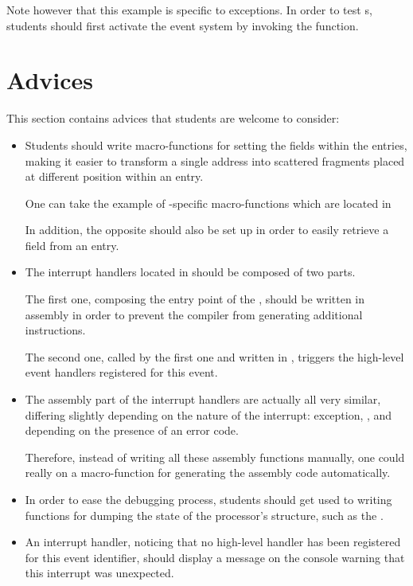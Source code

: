 Note however that this example is specific to exceptions. In order to test
s, students should first activate the event system by invoking the
 function.

%
%

\section{Advices}

This section contains advices that students are welcome to consider:

\begin{itemize}
  \item
    Students should write macro-functions for setting the fields within
    the  entries, making it easier to transform a single address
    into scattered fragments placed at different position within an entry.

    \-

    One can take the example of -specific macro-functions
    which are located in \\

    \-

    In addition, the opposite should also be set up in order to easily
    retrieve a field from an  entry.
  \item
    The interrupt handlers located in  should be
    composed of two parts.

    \-

    The first one, composing the entry point of the , should be written in assembly in order to prevent
    the compiler from generating additional instructions.

    \-

    The second one, called by the first one and written in , triggers
    the high-level event handlers registered for this event.
  \item
    The assembly part of the interrupt handlers are actually all very similar,
    differing slightly depending on the nature of the interrupt: exception,
    ,  \etc{} and depending on the presence of an
    error code.

    \-

    Therefore, instead of writing all these assembly functions manually,
    one could really on a macro-function for generating the assembly
    code automatically.
  \item
    In order to ease the debugging process, students should get used to
    writing functions for dumping the state of the processor's structure,
    such as the .
  \item
    An interrupt handler, noticing that no high-level handler has been
    registered for this event identifier, should display a message on the
    console warning that this interrupt was unexpected.


\end{itemize}
